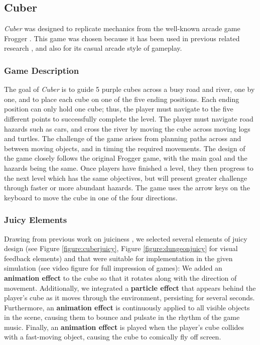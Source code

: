 \documentclass{sigchi}
\begin{document}
\subsection{Cuber}
\textit{Cuber} was designed to replicate mechanics from the well-known arcade game Frogger \cite{frogger:arcade}. This game was chosen because it has been used in previous related research \cite{gerling2013effects}, and also for its casual arcade style of gameplay. 

\subsubsection{Game Description}
The goal of \textit{Cuber} is to guide 5 purple cubes across a busy road and river, one by one, and to place each cube on one of the five ending positions. Each ending position can only hold one cube; thus, the player must navigate to the five different points to successfully complete the level. The player must navigate road hazards such as cars, and cross the river by moving the cube across moving logs and turtles. The challenge of the game arises from planning paths across and between moving objects, and in timing the required movements. The design of the game closely follows the original Frogger \cite{frogger:arcade} game, with the main goal and the hazards being the same. Once players have finished a level, they then progress to the next level which has the same objectives, but will present greater challenge through faster or more abundant hazards. The game uses the arrow keys on the keyboard to move the cube in one of the four directions.
 
\subsubsection{Juicy Elements}
Drawing from previous work on juiciness \cite{deterding2015lens,hicks2018juicy,juul2016good}, we selected several elements of juicy design (see Figure \ref{figure:cuberjuicy}, Figure \ref{figure:dungeonjuicy} for visual feedback elements) and that were suitable for implementation in the given simulation (see video figure for full impression of games): We added an \textbf{animation effect} to the cube so that it rotates along with the direction of movement. Additionally, we integrated a \textbf{particle effect} that appears behind the player's cube as it moves through the environment, persisting for several seconds. Furthermore, an \textbf{animation effect} is continuously applied to all visible objects in the scene, causing them to bounce and pulsate in the rhythm of the game music. Finally, an \textbf{animation effect} is played when the player's cube collides with a fast-moving object, causing the cube to comically fly off screen. 
\end{document}
